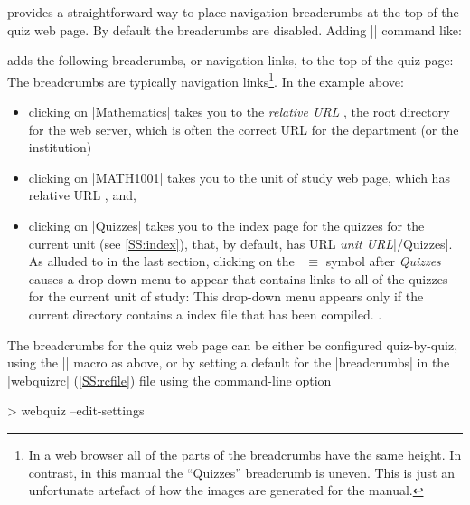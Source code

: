 \documentclass[svgnames]{article}
\makeatletter
\newcommand\macroIndex[1]{%
  \lowercase{\def\temp{#1}}%
  \expandafter\index\expandafter{\temp@\textbackslash#1}%
}
\newcommand\webquizrc{\index{webquizrc}%
  \BashCode|webquizrc| (\autoref{SS:rcfile})\xspace%
}
\makeatother
\begin{document}
    \WebQuiz provides a straightforward way to place navigation breadcrumbs
    at the top of the quiz web page. By default the
    breadcrumbs are disabled. Adding \LatexCode|\BreadCrumbs| command
    like:
    \begin{latexcode}
    \end{latexcode}
    adds the following breadcrumbs, or navigation links,
    to the top of the quiz page:
    The breadcrumbs are typically navigation links\footnote{In a web browser all of the
    parts of the breadcrumbs have the same height. In contrast, in this
    manual the ``Quizzes'' breadcrumb is uneven. This is just an
    unfortunate artefact of how the images are generated for the manual.}.
    In the example above:
    \begin{itemize}
      \item clicking on \BashCode|Mathematics| takes you to the
      \textit{relative URL} \BashCode{/}, the root directory for the web
      server, which is often the correct URL for the department (or the
      institution)
      \item clicking on
      \BashCode|MATH1001| takes you to the
      unit of study web page, which has relative URL , and,
      \item clicking on \BashCode|Quizzes| takes you to the index page for
      the quizzes for the current unit (see \autoref{SS:index}), that, by
      default, has URL \textit{unit URL}\BashCode|/Quizzes|.  As alluded
      to in the last section, clicking on the~{\large\color{red} $\equiv$}
      symbol after \textit{Quizzes} causes a drop-down menu to appear that
      contains links to all of the quizzes for the current unit of study:
      This drop-down menu appears only if the current directory
      contains a \WebQuiz index file that has been compiled.
      .
    \end{itemize}
    The breadcrumbs for the quiz web page can be either be configured
    quiz-by-quiz, using the \LatexCode|\BreadCrumbs| macro
    \macroIndex{BreadCrumbs} as above, or by setting a default for the
    \LatexCode|breadcrumbs|  in the \webquizrc file using the
    command-line option
    \begin{bashcode}
      > webquiz --edit-settings
    \end{bashcode}
\end{document}
